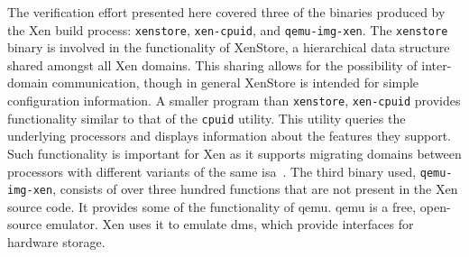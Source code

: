 The verification effort presented here
covered three of the binaries produced by the Xen build process:
\lstinline|xenstore|, \lstinline|xen-cpuid|, and \lstinline|qemu-img-xen|.
The \lstinline|xenstore| binary is involved in the functionality of
XenStore,
a hierarchical data structure shared amongst all Xen domains.
This sharing allows for the possibility of inter-domain communication,
though in general XenStore is intended for simple configuration information.
A smaller program than \lstinline|xenstore|, \lstinline|xen-cpuid|
provides functionality similar to that of the
\lstinline|cpuid| utility.
This utility queries the underlying processors
and displays information about the features they support.
Such functionality is important for Xen
as it supports migrating domains
between processors with different variants of the same \ac{isa}~\citep{cpuid-masking}.
The third binary used, \lstinline|qemu-img-xen|,
consists of over three hundred functions
that are not present in the Xen source code.
It provides some of the functionality of \ac{qemu}.
\Ac{qemu} is a free, open-source emulator.
Xen uses it to emulate \acp{dm}, which provide interfaces for hardware storage.

